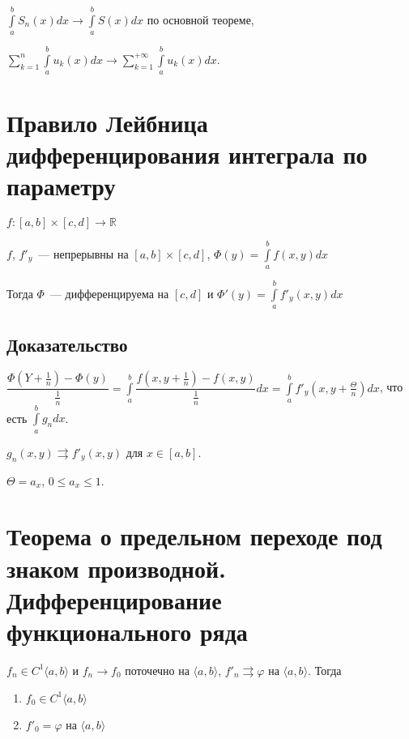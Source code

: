 \documentclass{article}
\begin{document}
                $\int\limits^b_a S_n(x)dx \rightarrow \int\limits^b_a S(x)dx$ по основной теореме,
                
                $\sum\limits^n_{k = 1} \int\limits^b_a u_k(x)dx \rightarrow \sum\limits^{+\infty}_{k = 1} \int\limits^b_a u_k(x)dx$.
                
    \newpage
    
    \section{Правило Лейбница дифференцирования интеграла по параметру}
    
        $f : [a, b] \times [c, d] \rightarrow \mathbb{R}$
            
        $f$, $f'_y$~--- непрерывны на $[a, b] \times [c, d]$, $\Phi(y) = \int\limits^b_a f(x, y) dx$
            
        Тогда $\Phi$~--- дифференцируема на $[c, d]$ и $\Phi'(y) = \int\limits^b_a f'_y (x, y) dx$
            
        \subsection{Доказательство} 
            
            $\dfrac{\Phi \left( Y + \frac{1}{n} \right) - \Phi(y)}{\frac{1}{n}} = \int\limits^b_a \dfrac{f \left( x, y + \frac{1}{n} \right) - f(x, y)}{\frac{1}{n}} dx = \int\limits^b_a f'_y \left(x, y + \frac{\Theta}{n} \right) dx$, что есть $\int\limits^b_a g_n dx$.
            
            $g_n(x, y) \rightrightarrows f'_y (x, y)$ для $x \in [a, b]$.
            
            $\Theta = a_x$, $0 \leq a_x \leq 1$.
            
    \newpage
    
    \section{Теорема о предельном переходе под знаком производной. Дифференцирование функционального ряда}
    
        $f_n \in C^1 \langle a, b \rangle$ и $f_n \rightarrow f_0$ поточечно на $\langle a, b \rangle$, $f'_n \rightrightarrows \varphi$ на $\langle a, b \rangle$. Тогда 
        
        \begin{enumerate}
        
            \item $f_0 \in C^1 \langle a, b \rangle$
            
            \item $f'_0 = \varphi$ на $\langle a, b \rangle$
            
        \end{enumerate}
        
\end{document}
